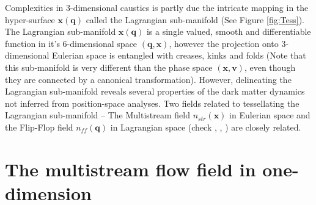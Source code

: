  
Complexities in 3-dimensional caustics is partly due the intricate mapping in the hyper-surface $\mathbf{x}(\mathbf{q})$ called the Lagrangian sub-manifold (See Figure \ref{fig:Tess}). The Lagrangian sub-manifold $\mathbf{x}(\mathbf{q})$  is a single valued, smooth and differentiable function in it's 6-dimensional space $(\mathbf{q}, \mathbf{x})$, however the projection onto 3-dimensional Eulerian space is entangled with creases, kinks and folds (Note that this  sub-manifold is very different than the phase space $(\mathbf{x},\mathbf{v})$, even though they are connected by a canonical transformation). However, delineating the Lagrangian sub-manifold reveals several properties of the dark matter dynamics not inferred from position-space analyses. Two fields related to tessellating the Lagrangian sub-manifold -- The Multistream field $n_{str}(\mathbf{x})$ in Eulerian space and the Flip-Flop field $n_{ff}(\mathbf{q})$ in Lagrangian space (check \cite{Shandarin2012}, \cite{Ramachandra2015}, \cite{Shandarin2016}) are closely related. 





\section{The multistream flow field in one-dimension}
\label{appendix:nstream}

